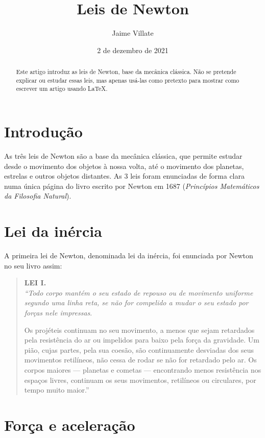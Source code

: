\documentclass[a4paper,12pt]{article}
\title{Leis de Newton}
\author{Jaime Villate}
\date{2 de dezembro de 2021}
\begin{document}
\maketitle

\begin{abstract}
  Este artigo introduz as leis de Newton, base da mecânica clássica.
  Não se pretende explicar ou estudar essas leis, mas apenas usá-las
  como pretexto para mostrar como escrever um artigo usando \LaTeX{}.
\end{abstract}
\section{Introdução}

As três leis de Newton são a base da mecânica clássica, que permite
estudar desde o movimento dos objetos à nossa volta, até o movimento
dos planetas, estrelas e outros objetos distantes.  As 3 leis foram
enunciadas de forma clara numa única página do livro escrito por
Newton em 1687 (\emph{Princípios Matemáticos da Filosofia Natural}).

\section{Lei da inércia}

A primeira lei de Newton, denominada lei da inércia, foi enunciada por
Newton no seu livro assim:

\begin{quotation}
\noindent\textbf{LEI I.}\\
\emph{``Todo corpo mantém o seu estado de repouso ou de
movimento uniforme segundo uma linha reta, se não for compelido a mudar o
seu estado por forças nele impressas}.

Os projéteis continuam no seu movimento, a menos
que sejam retardados pela resistência do ar ou impelidos para baixo pela
força da gravidade. Um pião, cujas partes, pela sua coesão, são
continuamente desviadas dos seus movimentos retilíneos, não cessa de
rodar se não for retardado pelo ar. Os corpos maiores --- planetas e
cometas --- encontrando menos resistência nos espaços livres, continuam
os seus movimentos, retilíneos ou circulares, por tempo muito maior.''
\end{quotation}

\section{Força e aceleração}
\end{document}
